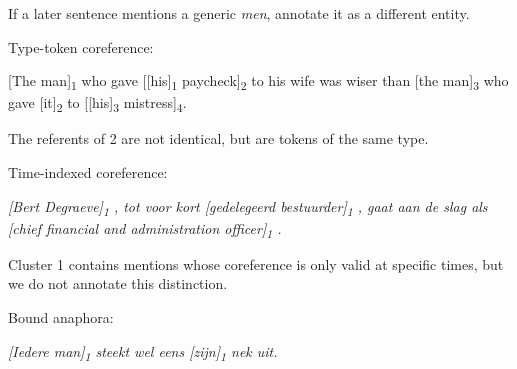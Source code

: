 \begin{itemize*}
    If a later sentence mentions a generic \emph{men},
    annotate it as a different entity.

\item Type-token coreference:

  {[}The man{]}\textsubscript{1} who gave {[}{[}his{]}\textsubscript{1} paycheck{]}\textsubscript{2} to
  his wife was wiser than {[}the man{]}\textsubscript{3} who gave {[}it{]}\textsubscript{2} to
  [{[}his{]}\textsubscript{3} mistress]\textsubscript{4}.

  The referents of 2 are not identical, but are tokens of the same type.

\item Time-indexed coreference:

  \emph{{[}Bert Degraeve{]}\textsubscript{1} , tot voor kort {[}gedelegeerd
  bestuurder{]}\textsubscript{1} , gaat aan de slag als {[}chief financial and
  administration officer{]}\textsubscript{1} .}

  Cluster 1 contains mentions whose coreference is only valid at
  specific times, but we do not annotate this distinction.
\item Bound anaphora:

  \emph{{[}Iedere man{]}\textsubscript{1} steekt wel eens {[}zijn{]}\textsubscript{1} nek uit.}

\end{itemize*}

